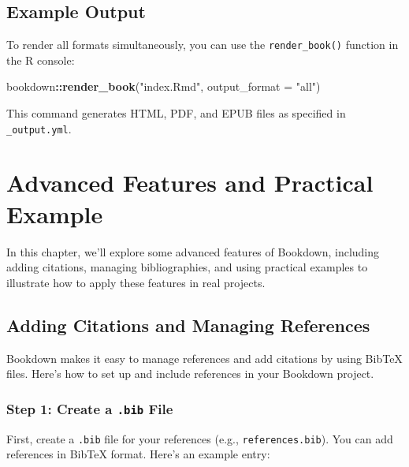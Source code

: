 \documentclass[
]{book}
\newenvironment{Shaded}{\begin{snugshade}}{\end{snugshade}}
\newcommand{\AttributeTok}[1]{\textcolor[rgb]{0.13,0.29,0.53}{#1}}
\newcommand{\FunctionTok}[1]{\textcolor[rgb]{0.13,0.29,0.53}{\textbf{#1}}}
\newcommand{\NormalTok}[1]{#1}
\newcommand{\SpecialCharTok}[1]{\textcolor[rgb]{0.81,0.36,0.00}{\textbf{#1}}}
\newcommand{\StringTok}[1]{\textcolor[rgb]{0.31,0.60,0.02}{#1}}
\theoremstyle{definition}
\theoremstyle{definition}
\theoremstyle{definition}
\theoremstyle{definition}
\theoremstyle{remark}
\begin{document}
\section{Example Output}\label{example-output}

To render all formats simultaneously, you can use the \texttt{render\_book()} function in the R console:

\begin{Shaded}
\begin{Highlighting}[]
\NormalTok{bookdown}\SpecialCharTok{::}\FunctionTok{render\_book}\NormalTok{(}\StringTok{"index.Rmd"}\NormalTok{, }\AttributeTok{output\_format =} \StringTok{"all"}\NormalTok{)}
\end{Highlighting}
\end{Shaded}

This command generates HTML, PDF, and EPUB files as specified in \texttt{\_output.yml}.

\chapter{Advanced Features and Practical Example}\label{advanced-features-and-practical-example}

In this chapter, we'll explore some advanced features of Bookdown, including adding citations, managing bibliographies, and using practical examples to illustrate how to apply these features in real projects.

\section{Adding Citations and Managing References}\label{adding-citations-and-managing-references}

Bookdown makes it easy to manage references and add citations by using BibTeX files. Here's how to set up and include references in your Bookdown project.

\subsection{\texorpdfstring{Step 1: Create a \texttt{.bib} File}{Step 1: Create a .bib File}}\label{step-1-create-a-.bib-file}

First, create a \texttt{.bib} file for your references (e.g., \texttt{references.bib}). You can add references in BibTeX format. Here's an example entry:
\end{document}
